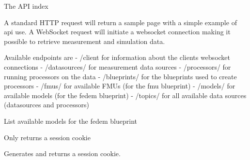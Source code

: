 \documentclass[letterpaper,10pt,english]{sphinxmanual}
\begin{document}
\begin{fulllineitems}
\label{\detokenize{src:src.views.index}}
The API index

A standard HTTP request will return a sample page with a simple example of api use.
A WebSocket request will initiate a websocket connection making it possible to retrieve measurement and simulation data.

Available endpoints are
- /client for information about the clients websocket connections
- /datasources/ for measurement data sources
- /processors/ for running processors on the data
- /blueprints/ for the blueprints used to create processors
- /fmus/ for available FMUs (for the fmu blueprint)
- /models/ for available models (for the fedem blueprint)
- /topics/ for all available data sources (datasources and processors)

\end{fulllineitems}


\begin{fulllineitems}
\label{\detokenize{src:src.views.models}}
List available models for the fedem blueprint

\end{fulllineitems}


\begin{fulllineitems}
\label{\detokenize{src:src.views.session_endpoint}}
Only returns a session cookie

Generates and returns a session cookie.

\end{fulllineitems}

\end{document}
